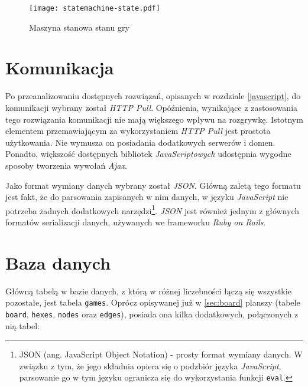 \documentclass[11pt,twoside]{report}
\begin{document}
\begin{figure}[ht]
  \begin{center}
    \texttt{[image: statemachine-state.pdf]}
  \end{center}
  \caption{Maszyna stanowa stanu gry}
  \label{statemachine-state}
\end{figure}

\section{Komunikacja}

Po przeanalizowaniu dostępnych rozwiązań, opisanych w rozdziale
\ref{javascript}, do komunikacji wybrany został \emph{HTTP
  Pull}. Opóźnienia, wynikające z zastosowania tego rozwiązania
komunikacji nie mają większego wpływu na rozgrywkę. Istotnym elementem
przemawiającym za wykorzystaniem \emph{HTTP Pull} jest prostota
użytkowania. Nie wymusza on posiadania dodatkowych serwerów i
domen. Ponadto, większość dostępnych bibliotek \emph{JavaScriptowych}
udostępnia wygodne sposoby tworzenia wywołań \emph{Ajax}.

Jako format wymiany danych wybrany został \emph{JSON}. Główną zaletą
tego formatu jest fakt, że do parsowania zapisanych w nim danych, w
języku \emph{JavaScript} nie potrzeba żadnych dodatkowych
narzędzi\footnote{JSON (ang. JavaScript Object Notation) - prosty
  format wymiany danych. W związku z tym, że jego składnia opiera się
  o podzbiór języka \emph{JavaScript}, parsowanie go w tym języku
  ogranicza się do wykorzystania funkcji \texttt{eval}.}. \emph{JSON}
jest również jednym z głównych formatów serializacji danych, używanych
we frameworku \emph{Ruby on Rails}.

\section{Baza danych}
Główną tabelą w bazie danych, z którą w różnej liczebności łączą się
wszystkie pozostałe, jest tabela \texttt{games}. Oprócz opisywanej już
w \ref{sec:board} planszy (tabele \texttt{board}, \texttt{hexes},
\texttt{nodes} oraz \texttt{edges}), posiada ona kilka dodatkowych,
połączonych z nią tabel:
\end{document}
